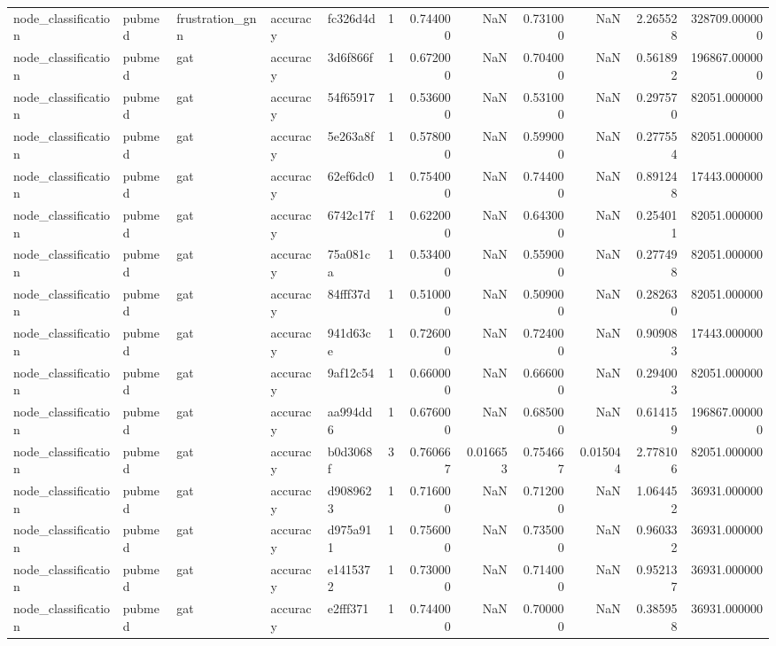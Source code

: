 \begin{tabular}{lllllrrrrrrr}
node_classification & pubmed & frustration_gnn & accuracy & fc326d4d & 1 & 0.744000 & NaN & 0.731000 & NaN & 2.265528 & 328709.000000 \\
node_classification & pubmed & gat & accuracy & 3d6f866f & 1 & 0.672000 & NaN & 0.704000 & NaN & 0.561892 & 196867.000000 \\
node_classification & pubmed & gat & accuracy & 54f65917 & 1 & 0.536000 & NaN & 0.531000 & NaN & 0.297570 & 82051.000000 \\
node_classification & pubmed & gat & accuracy & 5e263a8f & 1 & 0.578000 & NaN & 0.599000 & NaN & 0.277554 & 82051.000000 \\
node_classification & pubmed & gat & accuracy & 62ef6dc0 & 1 & 0.754000 & NaN & 0.744000 & NaN & 0.891248 & 17443.000000 \\
node_classification & pubmed & gat & accuracy & 6742c17f & 1 & 0.622000 & NaN & 0.643000 & NaN & 0.254011 & 82051.000000 \\
node_classification & pubmed & gat & accuracy & 75a081ca & 1 & 0.534000 & NaN & 0.559000 & NaN & 0.277498 & 82051.000000 \\
node_classification & pubmed & gat & accuracy & 84fff37d & 1 & 0.510000 & NaN & 0.509000 & NaN & 0.282630 & 82051.000000 \\
node_classification & pubmed & gat & accuracy & 941d63ce & 1 & 0.726000 & NaN & 0.724000 & NaN & 0.909083 & 17443.000000 \\
node_classification & pubmed & gat & accuracy & 9af12c54 & 1 & 0.660000 & NaN & 0.666000 & NaN & 0.294003 & 82051.000000 \\
node_classification & pubmed & gat & accuracy & aa994dd6 & 1 & 0.676000 & NaN & 0.685000 & NaN & 0.614159 & 196867.000000 \\
node_classification & pubmed & gat & accuracy & b0d3068f & 3 & 0.760667 & 0.016653 & 0.754667 & 0.015044 & 2.778106 & 82051.000000 \\
node_classification & pubmed & gat & accuracy & d9089623 & 1 & 0.716000 & NaN & 0.712000 & NaN & 1.064452 & 36931.000000 \\
node_classification & pubmed & gat & accuracy & d975a911 & 1 & 0.756000 & NaN & 0.735000 & NaN & 0.960332 & 36931.000000 \\
node_classification & pubmed & gat & accuracy & e1415372 & 1 & 0.730000 & NaN & 0.714000 & NaN & 0.952137 & 36931.000000 \\
node_classification & pubmed & gat & accuracy & e2fff371 & 1 & 0.744000 & NaN & 0.700000 & NaN & 0.385958 & 36931.000000 \\

\end{tabular}
